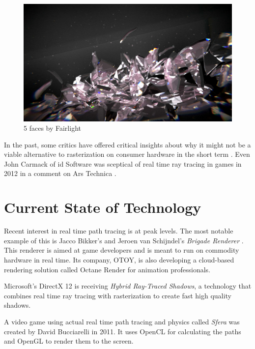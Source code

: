 \documentclass[
  twoside,
  11pt, a4paper,
  footinclude=true,
  headinclude=true,
  cleardoublepage=empty
]{scrreprt}
\begin{document}
\begin{figure}[H]
    \includegraphics[scale=0.5]{5faces}
    \centering
    \caption{5 faces by Fairlight}
    \label{fig:5faces}
\end{figure}

In the past, some critics have offered critical insights about why it might not be a viable
alternative to rasterization on consumer hardware in the short term
\cite{site:raytracing-vs-rasterization} \cite{site:codinghorror-raytracing}. Even John Carmack of
id Software was sceptical of real time ray tracing in games in 2012 in a comment on Ars Technica
\cite{site:carmack-scepticism}.

\section{Current State of Technology}
Recent interest in real time path tracing is at peak levels. The most notable
example of this is Jacco Bikker's and Jeroen van Schijndel's \emph{Brigade Renderer} \cite{article:brigade}
\cite{site:brigade}. This renderer is aimed at game developers and is meant to run on commodity
hardware in real time. Its company, OTOY, is also developing a cloud-based rendering solution
called Octane Render \cite{site:octane} for animation professionals.

Microsoft's DirectX 12 \cite{site:dx12-raytracing} is receiving \emph{Hybrid Ray-Traced Shadows}, a
technology that combines real time ray tracing with rasterization to create fast high quality
shadows.

A video game using actual real time path tracing and physics called \emph{Sfera} was created by
David Bucciarelli \cite{site:sfera} in 2011. It uses OpenCL for calculating the paths and OpenGL to
render them to the screen.
\end{document}
